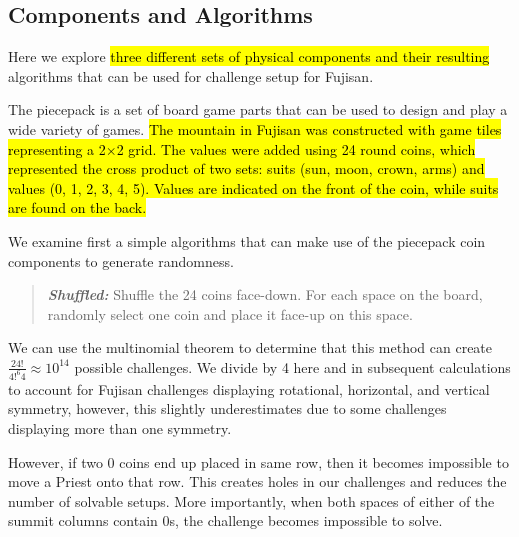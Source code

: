 \documentclass[journal]{IEEEtran}
\begin{document}


\subsection{Components and Algorithms}
\label{section:pcgalgs}
\noindent
Here we explore \hl{three different sets of physical components and their resulting} algorithms that can be used for challenge setup for Fujisan. 

The piecepack is a set of board game parts that can be used to design and play a wide variety of games\cite{GAMESYSTEM}. \hl{The mountain in Fujisan was constructed with game tiles representing a 2$\times$2 grid. The values were added using 24 round coins, which represented the cross product of two sets: suits (sun, moon, crown, arms) and values (0, 1, 2, 3, 4, 5). Values are indicated on the front of the coin, while suits are found on the back.}

We examine first a simple algorithms that can make use of the piecepack coin components to generate randomness. 

\begin{quote}
    
  {\it \bf Shuffled:} Shuffle the 24 coins face-down. For each space on the board, randomly select one coin and place it face-up on this space.
  
\end{quote}

We can use the multinomial theorem to determine that this method can create
$\frac{24!}{4!^{6}4} \approx 10^{14}$ possible challenges.  We divide by 4 here and in subsequent calculations to account for Fujisan challenges displaying rotational, horizontal, and vertical symmetry, however, this slightly underestimates due to some challenges displaying more than one symmetry.

However, if two 0 coins end up placed in same row, then it becomes impossible to move a Priest onto that row. This creates holes in our challenges and reduces the number of solvable setups. 
More importantly, when both spaces of either of the summit columns contain 0s, the challenge becomes impossible to solve.
\end{document}
